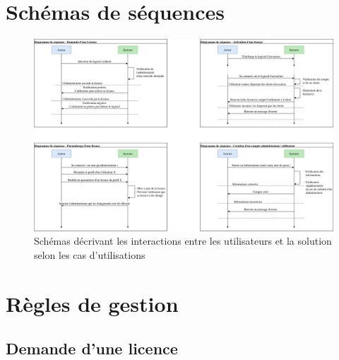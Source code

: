 \section{Schémas de séquences}

\begin{figure}[h]
	\centering
	\includegraphics[width=16cm]{main/png/Seq.png}
	\caption{Schémas décrivant les interactions entre les utilisateurs et la solution selon les cas d'utilisations}
	\label{fig:fig3}
\end{figure}

\newpage
\section{Règles de gestion}

\subsection{Demande d'une licence}

